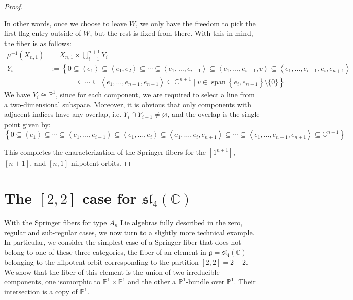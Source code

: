 \documentclass[11pt]{article}
\newcommand{\C}{\mathbb{C}}
\newcommand{\bP}{\mathbb{P}}
\newcommand{\Sp}{\operatorname{span}}
\theoremstyle{definition}
\numberwithin{equation}{section} %
\let\emptyset\varnothing
\begin{document}
\begin{proof}
\begin{enumerate}[(a)]
        In other words, once we choose to leave $W$, we only have the freedom to pick the first flag entry outside of $W$, but the rest is fixed from there. With this in mind, the fiber is as follows:
        \begin{align*}
        \mu^{-1}\left(X_{n,1}\right) &= X_{n,1} \times \bigcup_{i=1}^{n+1} Y_i \\
        Y_i &:= \left\{0\subseteq \left\langle e_1\right\rangle \subseteq \left\langle e_1, e_2\right\rangle \subseteq \cdots \subseteq \left\langle e_1, \ldots, e_{i-1}\right\rangle \subseteq \left\langle e_1, \ldots, e_{i-1},v\right\rangle \subseteq \left\langle e_1, \ldots, e_{i-1}, e_i, e_{n+1}\right\rangle\right. \\
        &\;\;\;\;\;\;\;\;\;\;\;\;\;\left.\subseteq \cdots \subseteq \left\langle e_1, \ldots, e_{n-1}, e_{n+1}\right\rangle\subseteq \C^{n+1} \mid v\in \Sp\left\{e_i, e_{n+1}\right\} \setminus \{0\}\right\}
        \end{align*}
        We have $Y_i \cong \bP^1$, since for each component, we are required to select a line from a two-dimensional subspace. Moreover, it is obvious that only components with adjacent indices have any overlap, i.e. $Y_i \cap Y_{i+1}\neq \emptyset$, and the overlap is the single point given by:
        $$
        \left\{0\subseteq \left\langle e_1\right\rangle \subseteq \cdots \subseteq \left\langle e_1, \ldots, e_{i-1}\right\rangle \subseteq \left\langle e_1, \ldots, e_i\right\rangle \subseteq \left\langle e_1, \ldots, e_i, e_{n+1}\right\rangle \subseteq \cdots \subseteq \left\langle e_1, \ldots, e_{n-1}, e_{n+1}\right\rangle\subseteq \C^{n+1} \right\} 
        $$   
    \end{enumerate} 
    
    \noindent This completes the characterization of the Springer fibers for the $\left[1^{n+1}\right]$, $[n+1]$, and $[n,1]$ nilpotent orbits. 
    \end{proof}

\noindent

\section{The $[2,2]$ case for $\mathfrak{sl}_4(\C)$}
With the Springer fibers for type $A_n$ Lie algebras fully described in the zero, regular and sub-regular cases, we now turn to a slightly more technical example. In particular, we consider the simplest case of a Springer fiber that does not belong to one of these three categories, the fiber of an element in $\mathfrak{g} = \mathfrak{sl}_4(\C)$ belonging to the nilpotent orbit corresponding to the partition $[2,2] = 2+2$. We show that the fiber of this element is the union of two irreducible components, one isomorphic to $\bP^1\times \bP^1$ and the other a $\bP^1$-bundle over $\bP^1$. Their intersection is a copy of $\bP^1$.
\end{document}
